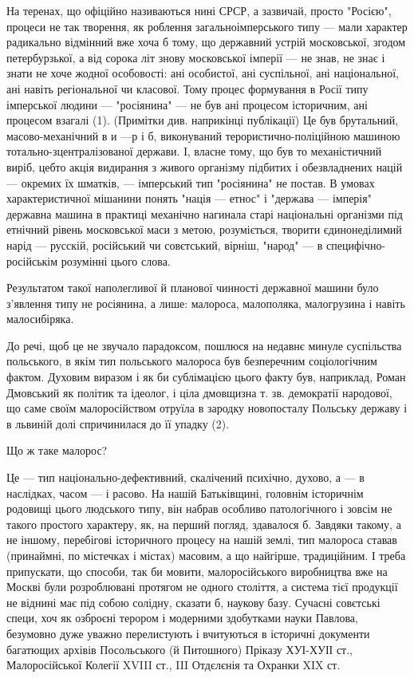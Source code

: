 На теренах, що офіційно називаються нині СРСР, а зазвичай, просто "Росією",
процеси не так творення, як роблення загальноімперського типу — мали характер
радикально відмінний вже хоча б тому, що державний устрій московської, згодом
петербурзької, а від сорока літ знову московської імперії — не знав, не знає і
знати не хоче жодної особовості: ані особистої, ані суспільної, ані
національної, ані навіть регіональної чи класової. Тому процес формування в
Росії типу імперської людини — "росіянина" — не був ані процесом історичним,
ані процесом взагалі (1). (Примітки див. наприкінці публікації) Це був
брутальний, масово-механічний в и —р і б, виконуваний терористично-поліційною
машиною тотально-зцентралізованої держави. І, власне тому, що був то
механістичний виріб, цебто акція видирання з живого організму підбитих і
обезвладнених націй — окремих їх шматків, — імперський тип "росіянина" не
постав. В умовах характеристичної мішанини понять "нація — етнос" і "держава —
імперія" державна машина в практиці механічно нагинала старі національні
організми під етнічний рівень московської маси з метою, розуміється, творити
єдинонеділимий нарід — русскій, російський чи совєтський, вірніш, "народ" — в
специфічно-російськім розумінні цього слова.

Результатом такої наполегливої й планової чинності державної машини було
з'явлення типу не росіянина, а лише: малороса, малополяка, малогрузина і навіть
малосибіряка.

До речі, щоб це не звучало парадоксом, пошлюся на недавнє минуле суспільства
польського, в якім тип польського малороса був безперечним соціологічним
фактом. Духовим виразом і як би сублімацією цього факту був, наприклад, Роман
Дмовський як політик та ідеолог, і ціла дмовщизна т. зв. демократії народової,
що саме своїм малоросійством отруїла в зародку новопосталу Польську державу і в
львиній долі спричинилася до її упадку (2).

Що ж таке малорос?

Це — тип національно-дефективний, скалічений психічно, духово, а — в наслідках,
часом — і расово. На нашій Батьківщині, головнім історичнім родовищі цього
людського типу, він набрав особливо патологічного і зовсім не такого простого
характеру, як, на перший погляд, здавалося б. Завдяки такому, а не іншому,
перебігові історичного процесу на нашій землі, тип малороса ставав (принаймні,
по містечках і містах) масовим, а що найгірше, традиційним. І треба припускати,
що способи, так би мовити, малоросійського виробництва вже на Москві були
розроблювані протягом не одного століття, а система тієї продукції не віднині
має під собою солідну, сказати б, наукову базу. Сучасні совєтські специ, хоч як
озброєні терором і модерними здобутками науки Павлова, безумовно дуже уважно
перелистують і вчитуються в історичні документи багатющих архівів Посольського
(й Питошного) Пріказу ХУІ-ХУІІ ст., Малоросійської Колегії XVIII ст., III
Отдєлєнія та Охранки XIX ст.

